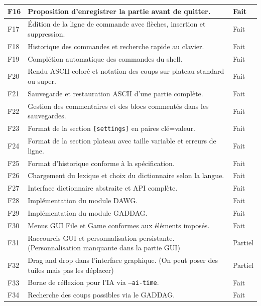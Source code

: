 \documentclass[a4paper]{article}
\begin{document}
\begin{longtable}{|p{1.3cm}|p{11.4cm}|p{1.8cm}|}
    \hline
    F16 & Proposition d'enregistrer la partie avant de quitter. & Fait \\
    \hline
    F17 & Édition de la ligne de commande avec flèches, insertion et suppression. & Fait \\
    \hline
    F18 & Historique des commandes et recherche rapide au clavier. & Fait \\
    \hline
    F19 & Complétion automatique des commandes du shell. & Fait \\
    \hline
    F20 & Rendu ASCII coloré et notation des coups sur plateau standard ou super. & Fait \\
    \hline
    F21 & Sauvegarde et restauration ASCII d'une partie complète. & Fait \\
    \hline
    F22 & Gestion des commentaires et des blocs commentés dans les sauvegardes. & Fait \\
    \hline
    F23 & Format de la section \texttt{[settings]} en paires clé=valeur. & Fait \\
    \hline
    F24 & Format de la section plateau avec taille variable et erreurs de ligne. & Fait \\
    \hline
    F25 & Format d'historique conforme à la spécification. & Fait \\
    \hline
    F26 & Chargement du lexique et choix du dictionnaire selon la langue. & Fait \\
    \hline
    F27 & Interface dictionnaire abstraite et API complète. & Fait \\
    \hline
    F28 & Implémentation du module DAWG. & Fait \\
    \hline
    F29 & Implémentation du module GADDAG. & Fait \\
    \hline
    F30 & Menus GUI File et Game conformes aux éléments imposés. & Fait \\
    \hline
    F31 & Raccourcis GUI et personnalisation persistante.\newline \newline (Personnalisation manquante dans la partie GUI) & Partiel \\
    \hline
    F32 & Drag and drop dans l'interface graphique. \newline \newline (On peut poser des tuiles mais pas les déplacer) & Partiel \\
    \hline
    F33 & Borne de réflexion pour l'IA via \texttt{--ai-time}. & Fait \\
    \hline
    F34 & Recherche des coups possibles via le GADDAG. & Fait \\

\end{longtable}
\end{document}
